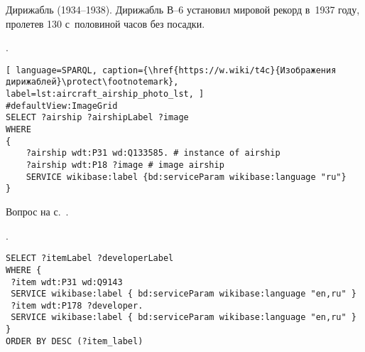%
\begin{marginfigure}[3.2cm]
{%
\setlength{\fboxsep}{0pt}%
\setlength{\fboxrule}{1pt}%
%
}
    \caption{Дирижабль  (1934--1938). 
             Дирижабль В--6 установил мировой рекорд в~1937 году, 
             пролетев 130 с~половиной часов без посадки.
    }%
    \label{fig:airship-stamp}%
\end{marginfigure}
% 
\begin{task}
    \label{answer:aircraft_question_airship_2}
    . 
    
	\begin{lstlisting}[ language=SPARQL, caption={\href{https://w.wiki/t4c}{Изображения дирижаблей}\protect\footnotemark}, label=lst:aircraft_airship_photo_lst, ]
#defaultView:ImageGrid
SELECT ?airship ?airshipLabel ?image
WHERE
{
    ?airship wdt:P31 wd:Q133585. # instance of airship
  	?airship wdt:P18 ?image # image airship
    SERVICE wikibase:label {bd:serviceParam wikibase:language "ru"}
}
\end{lstlisting}
    
    \small{Вопрос на с.~\pageref{aircraft_question_5}.}
\end{task}


\begin{task}
    \label{answer:prog_lang_1}
    . 
	\begin{lstlisting}[language=SPARQL, caption={{\href{https://w.wiki/v4Q}{Создатели языков программирования}}\protect\footnotemark}, label=lst:prog_lang_answer_1]
SELECT ?itemLabel ?developerLabel
WHERE {
 ?item wdt:P31 wd:Q9143
 SERVICE wikibase:label { bd:serviceParam wikibase:language "en,ru" }
 ?item wdt:P178 ?developer.
 SERVICE wikibase:label { bd:serviceParam wikibase:language "en,ru" }
}
ORDER BY DESC (?item_label)
	\end{lstlisting}
\end{task}

